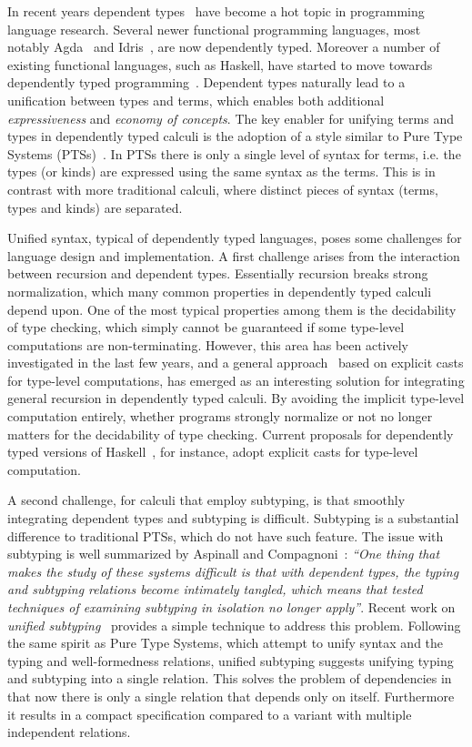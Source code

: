 In recent years dependent
types~\citep{coc,cayenne,dep:pisigma,sjoberg:msfp12,guru,fc:kind,zombie:popl14,zombie:popl15}
have become a hot topic in programming
language research. Several newer
functional programming languages, most notably Agda~\citep{2007_norell_agda} and
Idris~\citep{brady2013idris}, are now dependently typed. Moreover a number of existing functional
languages, such as Haskell, have started to move towards dependently typed programming~\citep{dependenthaskell}. Dependent types naturally lead to a unification between types and terms, which enables both
additional \emph{expressiveness} and \emph{economy of concepts}.
The key enabler for unifying terms and types in dependently typed
calculi is the adoption of a style similar to
Pure Type Systems (PTSs)~\citep{pts}. In PTSs there is only a single level
of syntax for terms, i.e. the types (or kinds) are expressed using the
same syntax as the terms. This is in contrast with more traditional calculi, where
distinct pieces of syntax (terms, types and kinds) are separated.

Unified syntax, typical of dependently typed languages,
poses some challenges for language design and implementation.
A first challenge arises from the interaction between recursion and dependent types.
Essentially recursion breaks strong normalization, which
many common properties in dependently typed calculi depend upon. One of the most
typical properties among them is the decidability of type checking,
which simply cannot be guaranteed if some
type-level computations are non-terminating.
However, this area has been actively investigated in the
last few years, and a general approach~\citep{guru,sjoberg:msfp12, kimmel:plpv, zombie:popl15,
  isotype} based on explicit casts for type-level computations,
has emerged as an interesting solution for integrating general recursion
in dependently typed calculi. By avoiding the implicit type-level computation
entirely, whether programs strongly normalize or not no longer matters for the
decidability of type checking.
Current proposals for dependently typed versions of Haskell~\citep{dependenthaskell},
for instance, adopt explicit casts for type-level computation.

A second challenge, for calculi that employ subtyping, is that
smoothly integrating
dependent types and subtyping is difficult. Subtyping is a
substantial difference to traditional PTSs, which do not have such feature.
The issue with subtyping
is well summarized by Aspinall and Compagnoni~\citep{subdep}:
\emph{``One thing that makes the study of these systems difficult is that
  with
dependent types, the typing and subtyping relations become intimately
tangled, which means that tested techniques of examining subtyping in
isolation no longer apply''}.
Recent work on \emph{unified subtyping}~\citep{full} provides a
simple technique to address this problem.
Following the same spirit as Pure Type Systems,
which attempt to unify syntax and the typing and well-formedness relations,
unified subtyping suggests unifying typing
and subtyping into a single relation. This solves the problem of dependencies
in that now there is only a single relation that depends only on itself. Furthermore
it results in a compact specification compared to a variant with multiple
independent relations.

